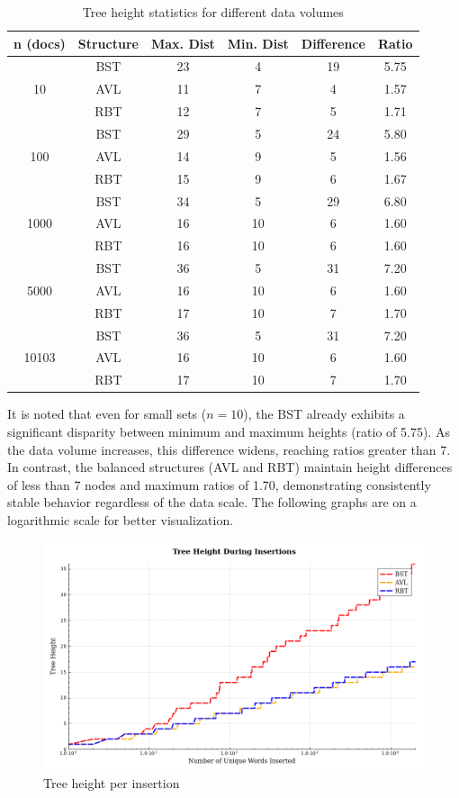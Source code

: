 \begin{table}[H]
    \centering
    \begin{tabular}{|c|c|c|c|c|c|}
    \hline
    \textbf{n (docs)} & \textbf{Structure} & \textbf{Max. Dist} & \textbf{Min. Dist} & \textbf{Difference} & \textbf{Ratio} \\
    \hline
    \multirow{3}{*}{10} & BST & 23 & 4 & 19 & 5.75 \\
    & AVL & 11 & 7 & 4 & 1.57 \\
    & RBT & 12 & 7 & 5 & 1.71 \\
    \hline
    \multirow{3}{*}{100} & BST & 29 & 5 & 24 & 5.80 \\
    & AVL & 14 & 9 & 5 & 1.56 \\
    & RBT & 15 & 9 & 6 & 1.67 \\
    \hline
    \multirow{3}{*}{1000} & BST & 34 & 5 & 29 & 6.80 \\
    & AVL & 16 & 10 & 6 & 1.60 \\
    & RBT & 16 & 10 & 6 & 1.60 \\
    \hline
    \multirow{3}{*}{5000} & BST & 36 & 5 & 31 & 7.20 \\
    & AVL & 16 & 10 & 6 & 1.60 \\
    & RBT & 17 & 10 & 7 & 1.70 \\
    \hline
    \multirow{3}{*}{10103} & BST & 36 & 5 & 31 & 7.20 \\
    & AVL & 16 & 10 & 6 & 1.60 \\
    & RBT & 17 & 10 & 7 & 1.70 \\
    \hline
    \end{tabular}
    \caption{Tree height statistics for different data volumes}
    \label{tab:altura_completa}
\end{table}

It is noted that even for small sets ($n = 10$), the BST already exhibits a significant
disparity between minimum and maximum heights (ratio of 5.75). As the data volume
increases, this difference widens, reaching ratios greater than 7. In contrast, the balanced
structures (AVL and RBT) maintain height differences of less than 7 nodes and maximum ratios of 1.70,
demonstrating consistently stable behavior regardless of the data scale. The following graphs
are on a logarithmic scale for better visualization.

\begin{figure}[H]
    \centering
    \includegraphics[width=0.75\linewidth]{img/Graph_1_10103.pdf}
    \caption{Tree height per insertion}
    \label{fig:maiorgalho}
\end{figure}

